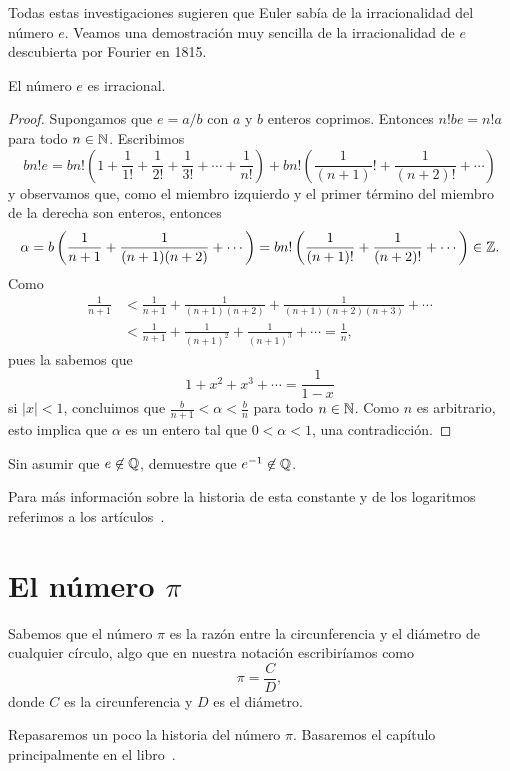 Todas estas investigaciones sugieren que Euler sabía de la irracionalidad del
número $e$. Veamos una demostración muy sencilla de la irracionalidad de $e$
descubierta por Fourier en 1815. 

\begin{theorem}
	El número $e$ es irracional.	
\end{theorem}

\begin{proof}
	Supongamos que $e=a/b$ con $a$ y $b$ enteros coprimos. Entonces $n!be=n!a$
	para todo $n\in\mathbb{N}$. Escribimos
	\[
		bn!e=bn!\left(1+\frac{1}{1!}+\frac{1}{2!}+\frac{1}{3!}+\cdots+\frac{1}{n!}\right)+bn!\left(\frac{1}{(n+1)}!+\frac{1}{(n+2)!}+\cdots\right)
	\]
	y observamos que, como el miembro izquierdo y el primer término del miembro
	de la derecha son enteros, entonces 
	\[
		\alpha=b\left(\frac{1}{n+1}+\frac{1}{(n+1)(n+2)}+\cdots\right)=bn!\left(\frac{1}{(n+1)!}+\frac{1}{(n+2)!}+\cdots\right)\in\mathbb{Z}.
	\]
	Como 
	\begin{align*}
		\frac{1}{n+1}&<\frac{1}{n+1}+\frac1{(n+1)(n+2)}+\frac{1}{(n+1)(n+2)(n+3)}+\cdots\\
		&<\frac{1}{n+1}+\frac{1}{(n+1)^2}+\frac{1}{(n+1)^3}+\cdots
		=\frac{1}{n},
	\end{align*}
	pues la sabemos que 
	\[
		1+x^2+x^3+\cdots=\frac{1}{1-x}
	\]
	si $|x|<1$, concluimos que 
	$\frac{b}{n+1}<\alpha<\frac{b}{n}$ para todo $n\in\mathbb{N}$. Como $n$ es
	arbitrario, esto implica que $\alpha$ es un entero tal que $0<\alpha<1$,
	una contradicción.
\end{proof}

\begin{exercise}
	Sin asumir que $e\not\in\mathbb{Q}$, 
	demuestre que $e^{-1}\not\in\mathbb{Q}$.
\end{exercise}

Para más información sobre la historia de esta constante y de los logaritmos
referimos a los 
artículos~\cite{MR1517859,MR1517841,MR1517806,MR1517796,MR1517770,MR1517761}.

\section*{El número $\pi$}

Sabemos que el número $\pi$ es la razón entre la circunferencia y el diámetro
de cualquier círculo, algo que en nuestra notación escribiríamos como
\[
	\pi=\frac{C}{D},
\]
donde $C$ es la circunferencia y $D$ es el diámetro. 

Repasaremos un poco la historia del número $\pi$. Basaremos el capítulo
principalmente en el libro~\cite{MR0449960}. 

